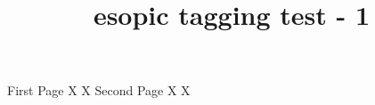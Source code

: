 \documentclass[a4paper,twoside]{article}
\title{esopic tagging test - 1}
\begin{document}
  \Huge \bfseries

\noindent
\hrulefill First Page\hrulefill 
\vfill
\noindent 
X \hfill X 
\newpage 
\noindent
\hrulefill Second Page\hrulefill 
\vfill
\noindent 
X \hfill X
\end{document}
